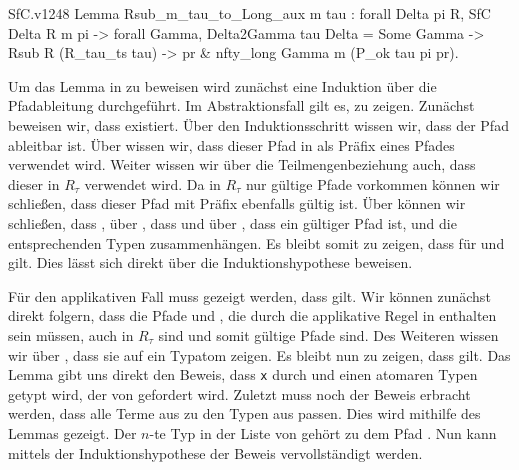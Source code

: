\begin{code}{SfC.v}{}{1248}
Lemma Rsub_m_tau_to_Long_aux {m tau} : 
    forall Delta pi R, SfC Delta R m pi ->
      forall Gamma, Delta2Gamma tau Delta = Some Gamma ->
        Rsub R (R_tau_ts tau) ->
          {pr & nfty_long Gamma m (P_ok tau pi pr)}.
\end{code}

Um das Lemma in  zu beweisen wird zunächst eine Induktion über die Pfadableitung durchgeführt.
Im Abstraktionsfall gilt es,  zu zeigen. Zunächst beweisen wir, dass  existiert. Über den Induktionsschritt wissen wir, dass der Pfad  ableitbar ist. Über  wissen wir, dass dieser Pfad in als Präfix eines Pfades  verwendet wird. Weiter wissen wir über die Teilmengenbeziehung auch, dass dieser in $R_\tau$ verwendet wird. Da in $R_\tau$ nur gültige Pfade vorkommen können wir schließen, dass dieser Pfad mit Präfix  ebenfalls gültig ist. Über  können wir schließen, dass , über , dass  und über , dass  ein gültiger Pfad ist, und die entsprechenden Typen zusammenhängen. Es bleibt somit zu zeigen, dass  für  und  gilt. Dies lässt sich direkt über die Induktionshypothese beweisen.
    
Für den applikativen Fall muss gezeigt werden, dass  gilt. Wir können zunächst direkt folgern, dass die Pfade  und , die durch die applikative Regel in  enthalten sein müssen, auch in $R_\tau$ sind und somit gültige Pfade sind. Des Weiteren wissen wir über , dass sie auf ein Typatom  zeigen. Es bleibt nun zu zeigen, dass  gilt. Das Lemma  gibt uns direkt den Beweis, dass \texttt{x} durch  und einen atomaren Typen getypt wird, der von  gefordert wird. Zuletzt muss noch der Beweis erbracht werden, dass alle Terme  aus  zu den Typen aus  passen. Dies wird mithilfe des Lemmas  gezeigt. Der $n$-te Typ in der Liste von  gehört zu dem Pfad . Nun kann mittels der Induktionshypothese der Beweis vervollständigt werden.

